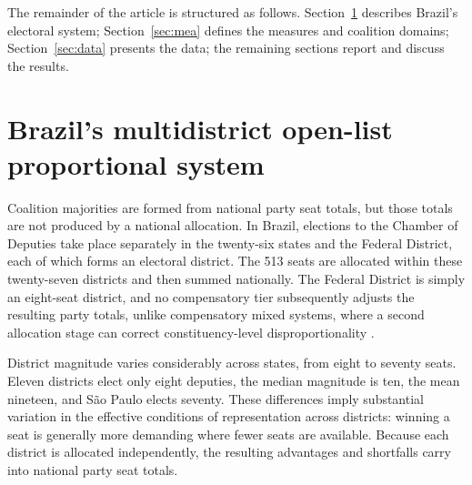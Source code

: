 \documentclass[11pt]{article}
\begin{document}
The remainder of the article is structured as follows. Section~\ref{sec:brazil-system} describes Brazil's electoral system;
Section~\ref{sec:mea} defines the measures and coalition domains;
Section~\ref{sec:data} presents the data; the remaining sections report and
discuss the results.


\section{Brazil's multidistrict open-list proportional system}
\label{sec:brazil-system}

Coalition majorities are formed from national party seat totals, but those
totals are not produced by a national allocation. In Brazil, elections to the
Chamber of Deputies take place separately in the twenty-six states and the
Federal District, each of which forms an electoral district. The 513 seats are
allocated within these twenty-seven districts and then summed nationally. The
Federal District is simply an eight-seat district, and no compensatory tier
subsequently adjusts the resulting party totals, unlike compensatory mixed
systems, where a second allocation stage can correct constituency-level
disproportionality \parencite{FlisGrofmanKaminski2025Introduction, salamon2026mixed}.

District magnitude varies considerably across states, from eight to seventy
seats. Eleven districts elect only eight deputies, the median magnitude is ten,
the mean nineteen, and S\~ao Paulo elects seventy. These differences imply
substantial variation in the effective conditions of representation across
districts: winning a seat is generally more demanding where fewer seats are
available. Because each district is allocated independently, the resulting
advantages and shortfalls carry into national party seat totals. 
\end{document}
